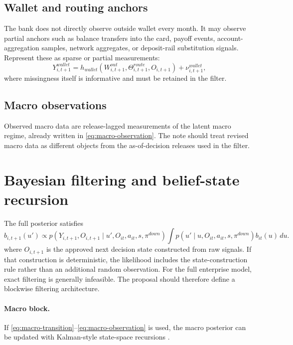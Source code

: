 \documentclass[11pt]{article}
\newcommand{\1}{\mathbf{1}}
\theoremstyle{definition}
\begin{document}
\subsection{Wallet and routing anchors}

The bank does not directly observe outside wallet every month. It may observe
partial anchors such as balance transfers into the card, payoff events,
account-aggregation samples, network aggregates, or deposit-rail substitution
signals. Represent these as sparse or partial measurements:
\begin{equation}
  Y_{i,t+1}^{wallet}
  =
  h_{wallet}(W^{out}_{i,t+1},\Theta^{route}_{i,t+1},O_{i,t+1}) + \nu^{wallet}_{i,t+1},
  \label{eq:obs-wallet}
\end{equation}
where missingness itself is informative and must be retained in the filter.

\subsection{Macro observations}

Observed macro data are release-lagged measurements of the latent macro regime,
already written in \eqref{eq:macro-observation}. The note should treat revised
macro data as different objects from the as-of-decision releases used in the
filter.

\section{Bayesian filtering and belief-state recursion}

The full posterior satisfies
\begin{equation}
  b_{i,t+1}(u')
  \propto
  p(Y_{i,t+1},O_{i,t+1}\mid u',O_{it},a_{it},s,\pi^{down})
  \int p(u'\mid u,O_{it},a_{it},s,\pi^{down})b_{it}(u)\,du.
  \label{eq:generic-filter}
\end{equation}
where $O_{i,t+1}$ is the approved next decision state constructed from raw
signals. If that construction is deterministic, the likelihood includes the
state-construction rule rather than an additional random observation.
For the full enterprise model, exact filtering is generally infeasible. The
proposal should therefore define a blockwise filtering architecture.

\paragraph{Macro block.}
If \eqref{eq:macro-transition}--\eqref{eq:macro-observation} is used, the macro
posterior can be updated with Kalman-style state-space recursions
\citep{durbinkoopman2012ssm}.
\end{document}

